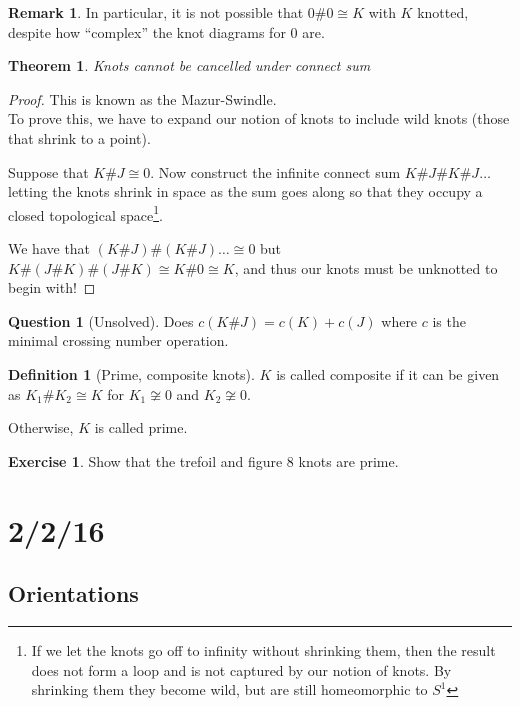 \documentclass[11pt]{article}
\theoremstyle{plain}
\newtheorem{thm}{Theorem}
\theoremstyle{definition}
\newtheorem{remark}{Remark}
\newtheorem{definition}{Definition}
\newtheorem{exercise}{Exercise}
\newtheorem{question}{Question}
\begin{document}
\begin{remark}
In particular, it is not possible that $0 \# 0 \cong K$ with $K$ knotted, despite how ``complex'' the knot diagrams for $0$ are.
\end{remark}

\begin{thm}
  Knots cannot be cancelled under connect sum
\end{thm}

\begin{proof} This is known as the Mazur-Swindle. \\
  To prove this, we have to expand our notion of knots to include wild knots (those that shrink to a point).

  Suppose that $K \# J \cong 0$. Now construct the infinite connect sum $K \# J \# K \# J \dots$ letting the knots shrink in space
  as the sum goes along so that they occupy a closed topological space\footnote{If we let the knots go off to infinity without shrinking them, then the result does not form a loop and is not captured by our notion of knots.
  By shrinking them they become wild, but are still homeomorphic to $S^1$}.

  We have that $(K \# J) \# (K \# J) \dots \cong 0$ but $K \# (J \# K) \# (J \# K) \cong K \# 0 \cong K$, and thus our knots must be unknotted to begin with!
\end{proof}


\begin{question}[Unsolved]
  Does $c(K \# J) = c(K) + c(J)$ where $c$ is the minimal crossing number operation.
\end{question}


\begin{definition}[Prime, composite knots]
  $K$ is called composite if it can be given as $K_1 \# K_2 \cong K$ for $K_1 \not \cong 0$ and $K_2 \not \cong 0$.

  Otherwise, $K$ is called prime.
\end{definition}


\begin{exercise}
  Show that the trefoil and figure 8 knots are prime.
\end{exercise}




\clearpage
\section{2/2/16}

\subsection{Orientations}
\end{document}
